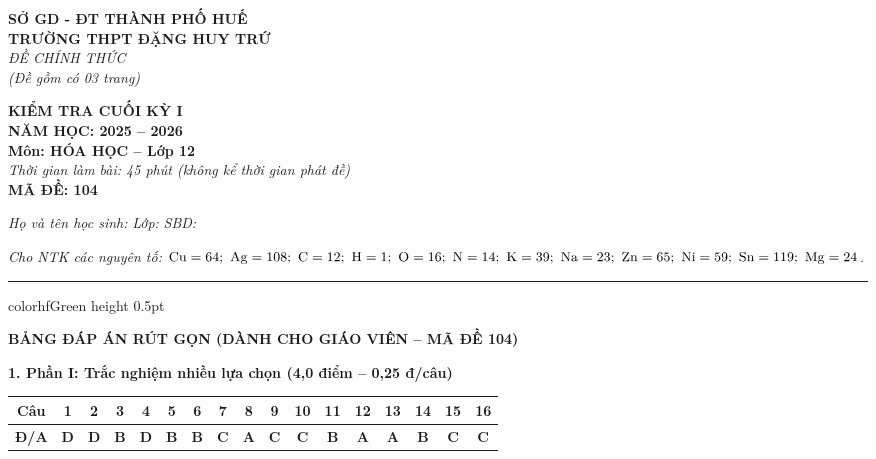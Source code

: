 \documentclass[11pt,a4paper]{article}
\begin{document}
\begin{minipage}[t]{0.48\textwidth}
\textbf{SỞ GD - ĐT THÀNH PHỐ HUẾ}\\
\textbf{TRƯỜNG THPT ĐẶNG HUY TRỨ}\\
\textit{ĐỀ CHÍNH THỨC}\\
\textit{(Đề gồm có 03 trang)}
\end{minipage}
\hfill
\begin{minipage}[t]{0.48\textwidth}
\raggedleft
\textbf{\color{hfRed}KIỂM TRA CUỐI KỲ I}\\
\textbf{NĂM HỌC: 2025 -- 2026}\\
\textbf{Môn: HÓA HỌC -- Lớp 12}\\
\textit{Thời gian làm bài: 45 phút (không kể thời gian phát đề)}\\
\textbf{MÃ ĐỀ: 104}
\end{minipage}

\vspace{4pt}
\noindent
\textit{Họ và tên học sinh:} \dotfill \textit{Lớp:} \dotfill \textit{SBD:} \dotfill

\vspace{3pt}
\noindent
\textit{\footnotesize Cho NTK các nguyên tố: $\ce{Cu}=64;\ \ce{Ag}=108;\ \ce{C}=12;\ \ce{H}=1;\ \ce{O}=16;\ \ce{N}=14;\ \ce{K}=39;\ \ce{Na}=23;\ \ce{Zn}=65;\ \ce{Ni}=59;\ \ce{Sn}=119;\ \ce{Mg}=24$.}

\vspace{3pt}
\hrule color{hfGreen} height 0.5pt

\vspace{6pt}
\begin{center}
{\Large\textbf{\color{hfRed}BẢNG ĐÁP ÁN RÚT GỌN (DÀNH CHO GIÁO VIÊN -- MÃ ĐỀ 104)}}
\end{center}

\vspace{2pt}
\noindent
\textbf{\color{mainGreen}1. Phần I: Trắc nghiệm nhiều lựa chọn (4,0 điểm -- 0,25 đ/câu)}
\begin{center}
\renewcommand{\arraystretch}{1.2}
\setlength{\tabcolsep}{3.5pt}
\begin{tabular}{|c|c|c|c|c|c|c|c|c|c|c|c|c|c|c|c|c|}
\hline
\rowcolor{tableGreen}
\textbf{Câu} & \textbf{1} & \textbf{2} & \textbf{3} & \textbf{4} & \textbf{5} & \textbf{6} & \textbf{7} & \textbf{8} & \textbf{9} & \textbf{10} & \textbf{11} & \textbf{12} & \textbf{13} & \textbf{14} & \textbf{15} & \textbf{16} \\
\hline
\textbf{Đ/A} & \textbf{\color{hfRed}D} & \textbf{\color{hfRed}D} & \textbf{\color{hfRed}B} & \textbf{\color{hfRed}D} & \textbf{\color{hfRed}B} & \textbf{\color{hfRed}B} & \textbf{\color{hfRed}C} & \textbf{\color{hfRed}A} & \textbf{\color{hfRed}C} & \textbf{\color{hfRed}C} & \textbf{\color{hfRed}B} & \textbf{\color{hfRed}A} & \textbf{\color{hfRed}A} & \textbf{\color{hfRed}B} & \textbf{\color{hfRed}C} & \textbf{\color{hfRed}C} \\
\hline
\end{tabular}
\end{center}
\end{document}
